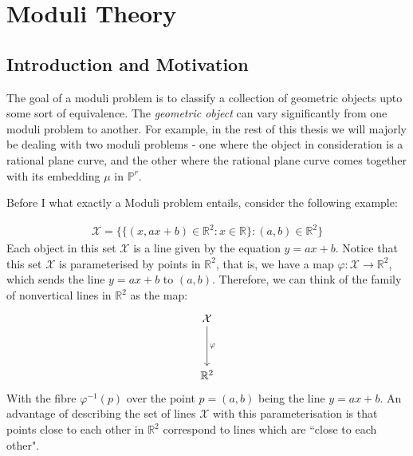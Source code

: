 \section{Moduli Theory}
\subsection{Introduction and Motivation}
The goal of a moduli problem is to classify a collection of geometric objects upto some sort of equivalence.
The \textit{geometric object} can vary significantly from one moduli problem to another. 
For example, in the rest of this thesis we will majorly be dealing with two moduli problems - one where the object in consideration is a rational plane curve, and the other where the rational plane curve comes together with its embedding $\mu$ in $\mathbb{P}^{r}$.

Before I what exactly a Moduli problem entails, consider the following example:

\begin{example}
    \label{exLinesInPlane}
\begin{align*}
    \mathcal{X} = \{\{(x, ax + b) \in \mathbb{R}^{2}: x \in \mathbb{R}\} : (a,b) \in \mathbb{R}^{2}\}
\end{align*}
Each object in this set $\mathcal{X}$ is a line given by the equation $y = ax + b$.
Notice that this set $\mathcal{X}$ is parameterised by points in $\mathbb{R}^{2}$, that is, we have a map $\varphi: \mathcal{X} \to \mathbb{R}^{2}$, which sends the line $y = ax + b$ to $(a,b)$.  
Therefore, we can think of the family of nonvertical lines in $\mathbb{R}^{2}$ as the map:
\[\begin{tikzcd}
	{\mathcal{X}} \\
	\\
	{\mathbb{R}^2}
	\arrow["\varphi",from=1-1, to=3-1]
\end{tikzcd}\]
With the fibre $\varphi^{-1}(p)$ over the point $p = (a,b)$ being the line $y = ax + b$.
An advantage of describing the set of lines $\mathcal{X}$ with this parameterisation is that points close to each other in $\mathbb{R}^{2}$ correspond to lines which are ``close to each other".  

\end{example}

